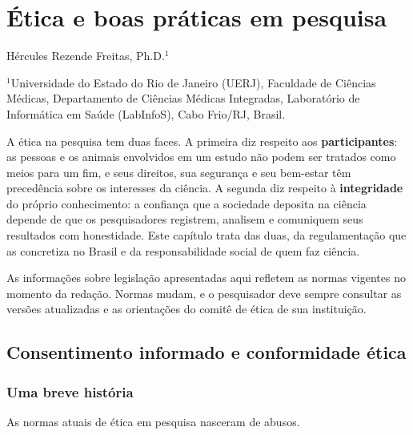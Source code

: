 \documentclass[
]{book}
\begin{document}
\chapter{Ética e boas práticas em pesquisa}\label{uxe9tica-e-boas-pruxe1ticas-em-pesquisa}

Hércules Rezende Freitas, Ph.D.\(^1\)

\(^1\)Universidade do Estado do Rio de Janeiro (UERJ), Faculdade de Ciências Médicas, Departamento de Ciências Médicas Integradas, Laboratório de Informática em Saúde (LabInfoS), Cabo Frio/RJ, Brasil.

A ética na pesquisa tem duas faces. A primeira diz respeito aos \textbf{participantes}: as pessoas e os animais envolvidos em um estudo não podem ser tratados como meios para um fim, e seus direitos, sua segurança e seu bem-estar têm precedência sobre os interesses da ciência. A segunda diz respeito à \textbf{integridade} do próprio conhecimento: a confiança que a sociedade deposita na ciência depende de que os pesquisadores registrem, analisem e comuniquem seus resultados com honestidade. Este capítulo trata das duas, da regulamentação que as concretiza no Brasil e da responsabilidade social de quem faz ciência.

As informações sobre legislação apresentadas aqui refletem as normas vigentes no momento da redação. Normas mudam, e o pesquisador deve sempre consultar as versões atualizadas e as orientações do comitê de ética de sua instituição.

\section{Consentimento informado e conformidade ética}\label{consentimento-informado-e-conformidade-uxe9tica}

\subsection{Uma breve história}\label{uma-breve-histuxf3ria}

As normas atuais de ética em pesquisa nasceram de abusos.
\end{document}
